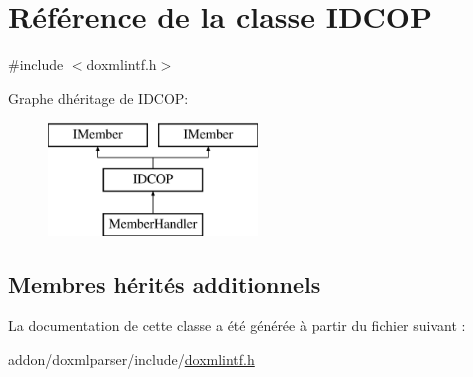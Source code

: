 \hypertarget{class_i_d_c_o_p}{}\section{Référence de la classe I\+D\+C\+O\+P}
\label{class_i_d_c_o_p}


{\ttfamily \#include $<$doxmlintf.\+h$>$}

Graphe d\textquotesingle{}héritage de I\+D\+C\+O\+P\+:\begin{figure}[H]
\begin{center}
\leavevmode
\includegraphics[height=3.000000cm]{class_i_d_c_o_p}
\end{center}
\end{figure}
\subsection*{Membres hérités additionnels}


La documentation de cette classe a été générée à partir du fichier suivant \+:\begin{DoxyCompactItemize}
\item 
addon/doxmlparser/include/\hyperlink{include_2doxmlintf_8h}{doxmlintf.\+h}\end{DoxyCompactItemize}
